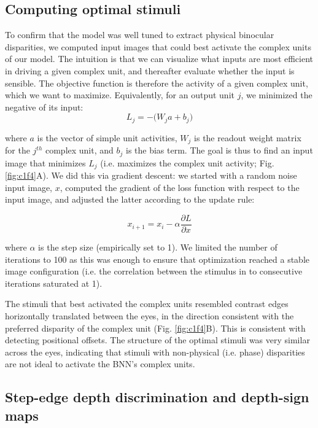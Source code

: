 \subsection*{Computing optimal stimuli}

To confirm that the model was well tuned to extract physical binocular disparities, we computed input images that could best activate the complex units of our model. The intuition is that we can visualize what inputs are most efficient in driving a given complex unit, and thereafter evaluate whether the input is sensible. The objective function is therefore the activity of a given complex unit, which we want to maximize. Equivalently, for an output unit $j$, we minimized the negative of its input:
\begin{equation}
  L_j = - \big( W_j a + b_j \big) 
  \label{eq:OptLoss}
\end{equation}

where $a$ is the vector of simple unit activities, $W_j$ is the readout weight matrix for the $j^{th}$ complex unit, and $b_j$ is the bias term. The goal is thus to find an input image that minimizes $L_j$ (i.e. maximizes the complex unit activity; Fig. \ref{fig:c1f4}A). We did this via gradient descent: we started with a random noise input image, $x$, computed the gradient of the loss function with respect to the input image, and adjusted the latter according to the update rule:

\begin{equation}
  x_{i+1} = x_i - \alpha\frac{\partial L}{\partial x}
\end{equation}

where $\alpha$ is the step size (empirically set to 1). We limited the number of iterations to 100 as this was enough to ensure that optimization reached a stable image configuration (i.e. the correlation between the stimulus in to consecutive iterations saturated at 1). 

The stimuli that best activated the complex units resembled contrast edges horizontally translated between the eyes, in the direction consistent with the preferred disparity of the complex unit (Fig. \ref{fig:c1f4}B). This is consistent with detecting positional offsets. The structure of the optimal stimuli was very similar across the eyes, indicating that stimuli with non-physical (i.e. phase) disparities are not ideal to activate the BNN's complex units. 


\subsection*{Step-edge depth discrimination and depth-sign maps}

